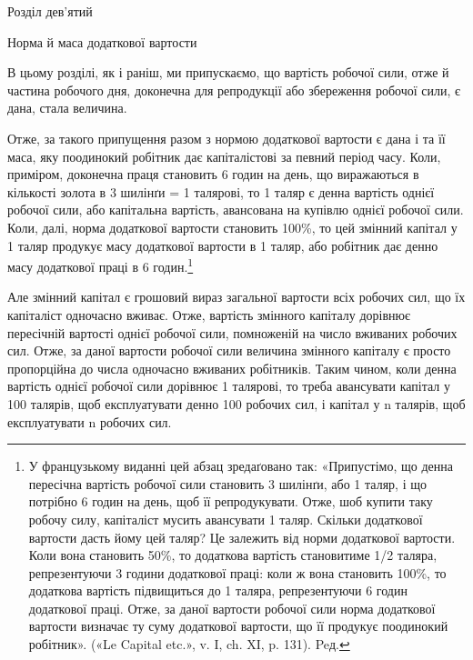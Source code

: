 Розділ дев'ятий

Норма й маса додаткової вартости

В цьому розділі, як і раніш, ми припускаємо, що вартість
робочої сили, отже й частина робочого дня, доконечна для репродукції
або збереження робочої сили, є дана, стала величина.

Отже, за такого припущення разом з нормою додаткової вартости
є дана і та її маса, яку поодинокий робітник дає капіталістові
за певний період часу. Коли, приміром, доконечна праця
становить 6 годин на день, що виражаються в кількості золота
в 3 шилінґи = 1 талярові, то 1 таляр є денна вартість однієї
робочої сили, або капітальна вартість, авансована на купівлю
однієї робочої сили. Коли, далі, норма додаткової вартости становить
100\%, то цей змінний капітал у 1 таляр продукує масу
додаткової вартости в 1 таляр, або робітник дає денно масу додаткової
праці в 6 годин.\footnote*{
У французькому виданні цей абзац зредаґовано так: «Припустімо,
що денна пересічна вартість робочої сили становить 3 шилінґи, або 1 таляр,
і що потрібно 6 годин на день, щоб її репродукувати. Отже, шоб
купити таку робочу силу, капіталіст мусить авансувати 1 таляр. Скільки
додаткової вартости дасть йому цей таляр? Це залежить від норми додаткової
вартости. Коли вона становить 50\%, то додаткова вартість становитиме
1/2 таляра, репрезентуючи 3 години додаткової праці: коли ж вона
становить 100\%, то додаткова вартість підвищиться до 1 таляра, репрезентуючи
6 годин додаткової праці. Отже, за даної вартости робочої сили
норма додаткової вартости визначає ту суму додаткової вартости, що її
продукує поодинокий робітник». («Le Capital etc.», v. I, ch. XI, p. 131). Peд.
}

Але змінний капітал є грошовий вираз загальної вартости всіх
робочих сил, що їх капіталіст одночасно вживає. Отже, вартість
змінного капіталу дорівнює пересічній вартості однієї робочої
сили, помноженій на число вживаних робочих сил. Отже, за даної
вартости робочої сили величина змінного капіталу є просто пропорційна
до числа одночасно вживаних робітників. Таким чином,
коли денна вартість однієї робочої сили дорівнює 1 талярові, то
треба авансувати капітал у 100 талярів, щоб експлуатувати денно
100 робочих сил, і капітал у n талярів, щоб експлуатувати n робочих
сил.

